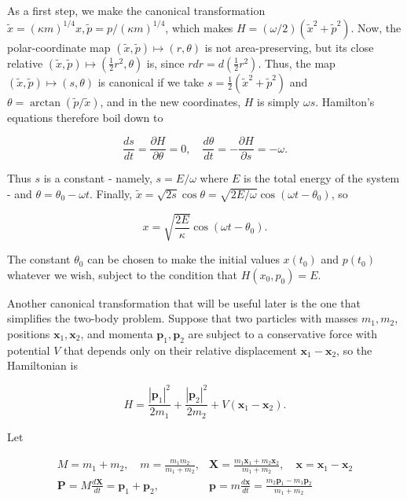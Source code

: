 \documentclass[10pt, letterpaper]{article}
\begin{document}
As a first step, we make the canonical transformation $\widetilde{x}=(\kappa m)^{1 / 4} x, \widetilde{p}=p /(\kappa m)^{1 / 4}$, which makes $H=(\omega / 2)\left(\widetilde{x}^{2}+\widetilde{p}^{2}\right)$. Now, the polar-coordinate map $(\widetilde{x}, \widetilde{p}) \mapsto(r, \theta)$ is not area-preserving, but its close relative $(\widetilde{x}, \widetilde{p}) \mapsto\left(\frac{1}{2} r^{2}, \theta\right)$ is, since $r d r=d\left(\frac{1}{2} r^{2}\right)$. Thus, the map $(\widetilde{x}, \widetilde{p}) \mapsto(s, \theta)$ is canonical if we take $s=\frac{1}{2}\left(\widetilde{x}^{2}+\widetilde{p}^{2}\right)$ and $\theta= \arctan (\widetilde{p} / \widetilde{x})$, and in the new coordinates, $H$ is simply $\omega s$. Hamilton's equations therefore boil down to

$$
\frac{d s}{d t}=\frac{\partial H}{\partial \theta}=0, \quad \frac{d \theta}{d t}=-\frac{\partial H}{\partial s}=-\omega .
$$

Thus $s$ is a constant - namely, $s=E / \omega$ where $E$ is the total energy of the system - and $\theta=\theta_{0}-\omega t$. Finally, $\widetilde{x}=\sqrt{2 s} \cos \theta=\sqrt{2 E / \omega} \cos \left(\omega t-\theta_{0}\right)$, so

$$
x=\sqrt{\frac{2 E}{\kappa}} \cos \left(\omega t-\theta_{0}\right) .
$$

The constant $\theta_{0}$ can be chosen to make the initial values $x\left(t_{0}\right)$ and $p\left(t_{0}\right)$ whatever we wish, subject to the condition that $H\left(x_{0}, p_{0}\right)=E$.

Another canonical transformation that will be useful later is the one that simplifies the two-body problem. Suppose that two particles with masses $m_{1}, m_{2}$, positions $\mathbf{x}_{1}, \mathbf{x}_{2}$, and momenta $\mathbf{p}_{1}, \mathbf{p}_{2}$ are subject to a conservative force with potential $V$ that depends only on their relative displacement $\mathbf{x}_{1}-\mathbf{x}_{2}$, so the Hamiltonian is

$$
H=\frac{\left|\mathbf{p}_{1}\right|^{2}}{2 m_{1}}+\frac{\left|\mathbf{p}_{2}\right|^{2}}{2 m_{2}}+V\left(\mathbf{x}_{1}-\mathbf{x}_{2}\right) .
$$

Let

$$
\begin{array}{cl}
M=m_{1}+m_{2}, \quad m=\frac{m_{1} m_{2}}{m_{1}+m_{2}}, & \mathbf{X}=\frac{m_{1} \mathbf{x}_{1}+m_{2} \mathbf{x}_{2}}{m_{1}+m_{2}}, \quad \mathbf{x}=\mathbf{x}_{1}-\mathbf{x}_{2} \\
\mathbf{P}=M \frac{d \mathbf{X}}{d t}=\mathbf{p}_{1}+\mathbf{p}_{2}, & \mathbf{p}=m \frac{d \mathbf{x}}{d t}=\frac{m_{2} \mathbf{p}_{1}-m_{1} \mathbf{p}_{2}}{m_{1}+m_{2}}
\end{array}
$$
\end{document}
